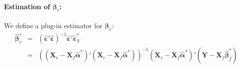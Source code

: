 \documentclass[12pt,a4paper]{report}
\begin{document}
	\paragraph{Estimation of $\boldsymbol{\beta}_r$:} We define a plug-in estimator for $\boldsymbol{\beta}_r$:
	\begin{eqnarray}
		\hat{\boldsymbol{\beta}}_r^{\varepsilon}&=&(\hat{\boldsymbol{\varepsilon}}'\hat{\boldsymbol{\varepsilon}})^{-1}\hat{\boldsymbol{\varepsilon}}'\hat{\boldsymbol{\varepsilon}}_Y^*  \nonumber \\
	&=&\left((\boldsymbol{X}_r-\boldsymbol{X}_f\hat{\boldsymbol{\alpha}}^*)'(\boldsymbol{X}_r-\boldsymbol{X}_f\hat{\boldsymbol{\alpha}}^*)\right)^{-1}(\boldsymbol{X}_r-\boldsymbol{X}_f\hat{\boldsymbol{\alpha}}^*)'(\boldsymbol{Y}- \boldsymbol{X}_f\hat{\boldsymbol{\beta}}^*_f)	\label{estimpluginlong}
	\end{eqnarray}
\end{document}
